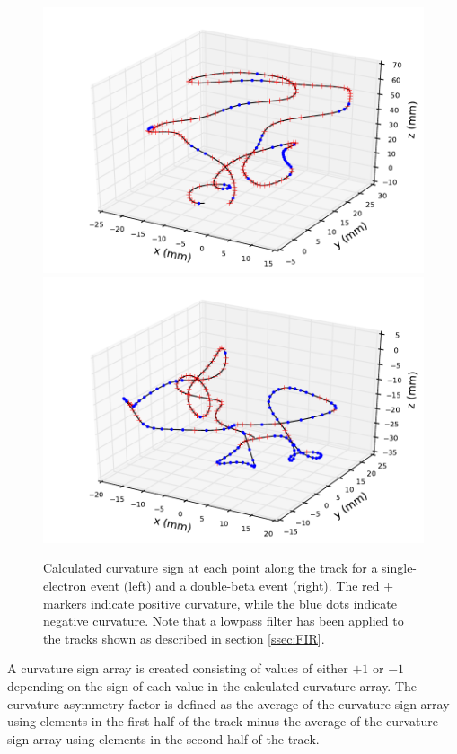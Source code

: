 \documentclass{JINST}
\begin{document}
\begin{figure}[!htb]
	\includegraphics[scale=0.48]{fig/plt_trkcurv_nmagse2_6.pdf}
	\includegraphics[scale=0.48]{fig/plt_trkcurv_nmagbb2_2.pdf}
	\caption{\label{fig_trkcurv}Calculated curvature sign at each point along the track for a single-electron event (left) and a double-beta event (right).  The red $+$ markers indicate positive curvature, while the blue dots indicate negative curvature.  Note that a lowpass filter has been applied to the tracks shown as described in section \protect\ref{ssec:FIR}.}
\end{figure}

A curvature sign array is created consisting of values of either $+1$ or $-1$ depending on the sign of each value in the calculated curvature array.  The curvature asymmetry factor is defined as the average of the curvature sign array using elements in the first half of the track minus the average of the curvature sign array using elements in the second half of the track.
\end{document}
